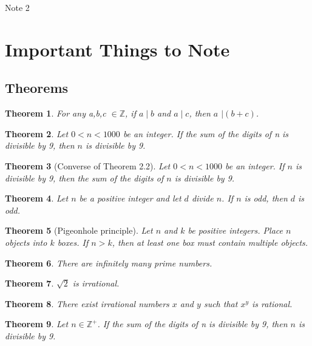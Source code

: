 \documentclass[12pt,a4paper]{article}
\newtheorem{theorem}{Theorem}[section]
\theoremstyle{definition}
\begin{document}
\raggedright

\begin{center}
	\huge{Note 2}
\end{center}

\section*{Important Things to Note}

\subsection*{Theorems}

\begin{theorem}
For any a,b,c $\in\mathbb{Z}$, if $a \mid b$ and $a \mid c$, then $a$ $\mid(b+c)$.
\end{theorem}

\begin{theorem}
Let $0<n<1000$ be an integer. If the sum of the digits of n is divisible by 9, then $n$ is divisible by 9.
\end{theorem}

\begin{theorem}[Converse of Theorem 2.2]
Let $0<n<1000$ be an integer. If $n$ is divisible by 9, then the sum of the digits of $n$ is divisible by 9.
\end{theorem}

\begin{theorem}
Let $n$ be a positive integer and let $d$ divide $n$. If $n$ is odd, then $d$ is odd.
\end{theorem}

\begin{theorem}[Pigeonhole principle]
Let $n$ and $k$ be positive integers. Place $n$ objects into $k$ boxes. If $n>k$, then at least one box must contain multiple objects.
\end{theorem}

\begin{theorem}
There are infinitely many prime numbers.
\end{theorem}

\begin{theorem}
$\sqrt{2}$ is irrational.
\end{theorem}

\begin{theorem}
There exist irrational numbers $x$ and $y$ such that $x^y$ is rational.
\end{theorem}

\begin{theorem}
Let $n\in\mathbb{Z}^+$. If the sum of the digits of n is divisible by 9, then $n$ is divisible by 9.
\end{theorem}
\end{document}
